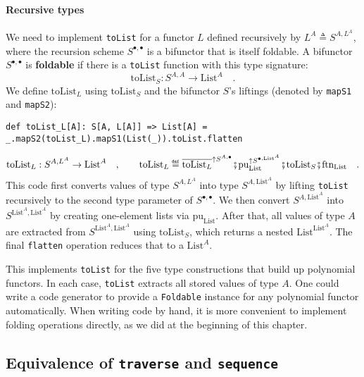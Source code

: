 \paragraph{Recursive types}

We need to implement \lstinline!toList! for a functor $L$ defined
recursively by $L^{A}\triangleq S^{A,L^{A}}$, where the recursion
scheme $S^{\bullet,\bullet}$ is a bifunctor that is itself foldable.
A bifunctor $S^{\bullet,\bullet}$ is \textbf{foldable}
if there is a \lstinline!toList! function with this type signature:
\[
\text{toList}_{S}:S^{A,A}\rightarrow\text{List}^{A}\quad.
\]
We define $\text{toList}_{L}$ using $\text{toList}_{S}$ and the
bifunctor $S$\textsf{'}s liftings (denoted by \lstinline!mapS1! and \lstinline!mapS2!):
\begin{lstlisting}
def toList_L[A]: S[A, L[A]] => List[A] = _.mapS2(toList_L).mapS1(List(_)).toList.flatten
\end{lstlisting}
\[
\text{toList}_{L}:S^{A,L^{A}}\rightarrow\text{List}^{A}\quad,\quad\quad\text{toList}_{L}\triangleq\overline{\text{toList}_{L}}^{\uparrow S^{A,\bullet}}\bef\text{pu}_{\text{List}}^{\uparrow S^{\bullet,\text{List}^{A}}}\bef\text{toList}_{S}\bef\text{ftn}_{\text{List}}\quad.
\]
This code first converts values of type $S^{A,L^{A}}$ into type $S^{A,\text{List}^{A}}$
by lifting \lstinline!toList! recursively to the second type parameter
of $S^{\bullet,\bullet}$. We then convert $S^{A,\text{List}^{A}}$
into $S^{\text{List}^{A},\text{List}^{A}}$ by creating one-element
lists via $\text{pu}_{\text{List}}$. After that, all values of type
$A$ are extracted from $S^{\text{List}^{A},\text{List}^{A}}$ using
$\text{toList}_{S}$, which returns a nested $\text{List}^{\text{List}^{A}}$.
The final \lstinline!flatten! operation reduces that to a $\text{List}^{A}$.

This implements \lstinline!toList! for the five type constructions
that build up polynomial functors. In each case, \lstinline!toList!
extracts all stored values of type $A$. One could write a code generator
to provide a \lstinline!Foldable! instance for any polynomial functor
automatically. When writing code by hand, it is more convenient to
implement folding operations directly, as we did at the beginning
of this chapter.

\subsection{Equivalence of \texttt{traverse} and \texttt{sequence}}

